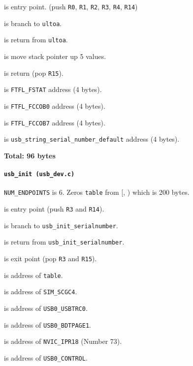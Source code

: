  is entry point.
(push \texttt{R0}, \texttt{R1}, \texttt{R2}, \texttt{R3},
\texttt{R4}, \texttt{R14})

 is branch to \texttt{ultoa}.

 is return from \texttt{ultoa}.

 is move stack pointer up 5 values.

 is return (pop \texttt{R15}).

\vspace{1em}

 is \texttt{FTFL\_FSTAT} address (4 bytes).

 is \texttt{FTFL\_FCCOB0} address (4 bytes).

 is \texttt{FTFL\_FCCOB7} address (4 bytes).

 is {\tiny
\texttt{usb\_string\_serial\_number\_default}} address (4 bytes).

\textbf{Total: 96 bytes}

\paragraph{\texttt{usb\_init (usb\_dev.c)}} \texttt{NUM\_ENDPOINTS} is 6.
Zeros \texttt{table} from [,
) which is 200 bytes.

 is entry point (push \texttt{R3} and \texttt{R14}).

 is branch to \texttt{usb\_init\_serialnumber}.

 is return from \texttt{usb\_init\_serialnumber}.

 is exit point (pop \texttt{R3} and \texttt{R15}).

 is address of \texttt{table}.

 is address of \texttt{SIM\_SCGC4}.

 is address of \texttt{USB0\_USBTRC0}.

 is address of \texttt{USB0\_BDTPAGE1}.

 is address of \texttt{NVIC\_IPR18} (Number 73).

 is address of \texttt{USB0\_CONTROL}.

